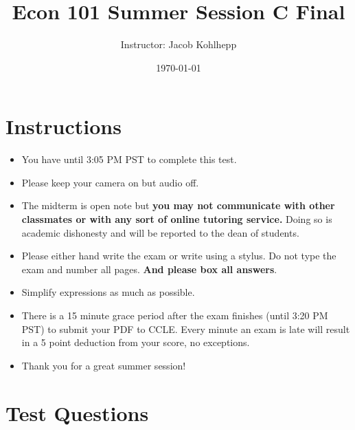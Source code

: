 \documentclass{article}
\begin{document}
\title{Econ 101 Summer Session C Final}
\author{Instructor: Jacob Kohlhepp}
\date{\today}

\maketitle

\section{Instructions}
\begin{itemize}
    \item You have until 3:05 PM PST to complete this test.
    \item Please keep your camera on but audio off.
    \item The midterm is open note but \textbf{you may not communicate with other classmates or with any sort of online tutoring service.} Doing so is academic dishonesty and will be reported to the dean of students.
    \item Please either hand write the exam or write using a stylus. Do not type the exam and number all pages. \textbf{And please box all answers}.
    \item Simplify expressions as much as possible.
    \item There is a 15 minute grace period after the exam finishes (until 3:20 PM PST) to submit your PDF to CCLE. Every minute an exam is late will result in a 5 point deduction from your score, no exceptions.
    \item Thank you for a great summer session!
\end{itemize}

\section{Test Questions}
\end{document}
